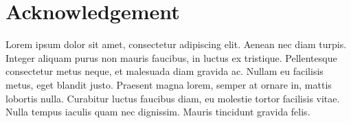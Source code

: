 \chapter{Acknowledgement}

Lorem ipsum dolor sit amet, consectetur adipiscing elit. Aenean nec diam turpis. Integer aliquam purus non mauris faucibus, in luctus ex tristique. Pellentesque consectetur metus neque, et malesuada diam gravida ac. Nullam eu facilisis metus, eget blandit justo. Praesent magna lorem, semper at ornare in, mattis lobortis nulla. Curabitur luctus faucibus diam, eu molestie tortor facilisis vitae. Nulla tempus iaculis quam nec dignissim. Mauris tincidunt gravida felis. 